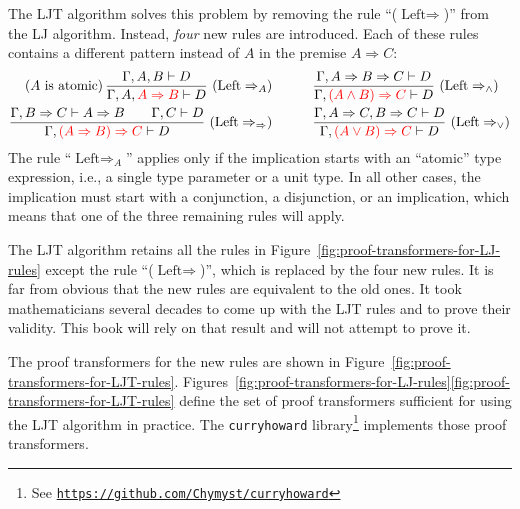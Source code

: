 The LJT algorithm solves this problem by removing the rule \textsf{``}($\text{Left}\Rightarrow$)\textsf{''}
from the LJ algorithm. Instead, \emph{four} new rules are introduced.
Each of these rules contains a different pattern instead of $A$ in
the premise $A\Rightarrow C$:
\begin{align*}
\text{(}A\text{ is atomic)\,}\frac{\Gamma,A,B\vdash D}{\Gamma,A,{\color{red}A\Rightarrow B}\vdash D}~(\text{Left}\Rightarrow_{A})\qquad & \quad\frac{\Gamma,A\Rightarrow B\Rightarrow C\vdash D}{\Gamma,{\color{red}(A\wedge B)\Rightarrow C}\vdash D}~(\text{Left}\Rightarrow_{\wedge})\\
\frac{\Gamma,B\Rightarrow C\vdash A\Rightarrow B\quad\quad\Gamma,C\vdash D}{\Gamma,{\color{red}(A\Rightarrow B)\Rightarrow C}\vdash D}~(\text{Left}\Rightarrow_{\Rightarrow})\qquad & \quad\frac{\Gamma,A\Rightarrow C,B\Rightarrow C\vdash D}{\Gamma,{\color{red}(A\vee B)\Rightarrow C}\vdash D}~(\text{Left}\Rightarrow_{\vee})
\end{align*}
The rule \textsf{``}$\text{Left}\Rightarrow_{A}$\textsf{''} applies only if the implication
starts with an \textsf{``}atomic\textsf{''} type expression, i.e., a single type parameter
or a unit type. In all other cases, the implication must start with
a conjunction, a disjunction, or an implication, which means that
one of the three remaining rules will apply.

The LJT algorithm retains all the rules in Figure~\ref{fig:proof-transformers-for-LJ-rules}
except the rule \textsf{``}($\text{Left}\Rightarrow$)\textsf{''}, which is replaced
by the four new rules. It is far from obvious that the new rules are
equivalent to the old ones. It took mathematicians several decades
to come up with the LJT rules and to prove their validity. This book
will rely on that result and will not attempt to prove it.

The proof transformers for the new rules are shown in Figure~\ref{fig:proof-transformers-for-LJT-rules}.
Figures~\ref{fig:proof-transformers-for-LJ-rules}\textendash \ref{fig:proof-transformers-for-LJT-rules}
define the set of proof transformers sufficient for using the LJT
algorithm in practice. The \lstinline!curryhoward!
library\texttt{}\footnote{See \texttt{\href{https://github.com/Chymyst/curryhoward}{https://github.com/Chymyst/curryhoward}}}
implements those proof transformers.

